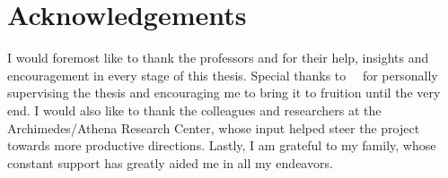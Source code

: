 %
\chapter*{Acknowledgements}
\label{sec:acknowledgements}
\vspace*{-10mm}

I would foremost like to thank the professors \thesisSupervisor and \thesisReviewerOne for their help, insights and encouragement in every stage of this thesis. Special thanks to \thesisSupervisorTitle \ \thesisSupervisor \ for personally supervising the thesis and encouraging me to bring it to fruition until the very end. I would also like to thank the colleagues and researchers at the Archimedes/Athena Research Center, whose input helped steer the project towards more productive directions. Lastly, I am grateful to my family, whose constant support has greatly aided me in all my endeavors. 